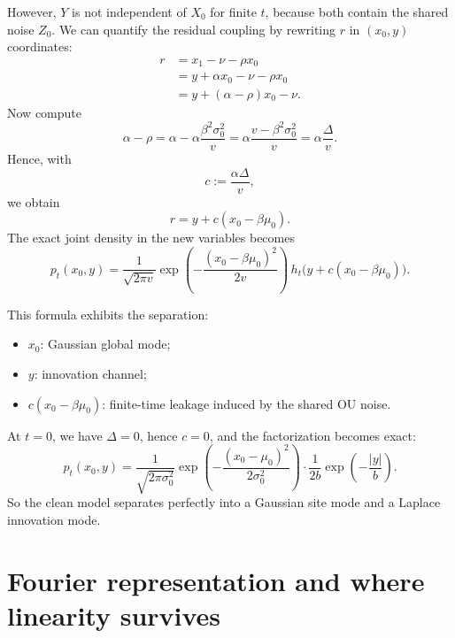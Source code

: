 \documentclass[11pt]{article}
\newcommand{\1}{\mathbf{1}}
\newcommand{\pt}{p_t}
\theoremstyle{definition}
\begin{document}
However, \(Y\) is not independent of \(X_0\) for finite \(t\), because both contain the shared noise \(Z_0\). We can quantify the residual coupling by rewriting \(r\) in \((x_0,y)\) coordinates:
\begin{align}
r
&= x_1 - \nu - \rho x_0 \\
&= y + \alpha x_0 - \nu - \rho x_0 \\
&= y + (\alpha-\rho)x_0 - \nu.
\end{align}
Now compute
\begin{equation}
\alpha-\rho = \alpha - \alpha\frac{\beta^2\sigma_0^2}{v}
= \alpha\frac{v-\beta^2\sigma_0^2}{v}
= \alpha\frac{\Delta}{v}.
\end{equation}
Hence, with
\begin{equation}
\label{eq:c-definition}
c:=\frac{\alpha\Delta}{v},
\end{equation}
we obtain
\begin{equation}
\label{eq:r-in-x0-y}
r = y + c(x_0-\beta\mu_0).
\end{equation}
The exact joint density in the new variables becomes
\begin{equation}
\label{eq:pt-x0-y}
\boxed{
\pt(x_0,y)=\frac{1}{\sqrt{2\pi v}}\exp\!\left(-\frac{(x_0-\beta\mu_0)^2}{2v}\right)
\, h_t\big(y+c(x_0-\beta\mu_0)\big).
}
\end{equation}

This formula exhibits the separation:
\begin{itemize}[leftmargin=2em]
    \item \(x_0\): Gaussian global mode;
    \item \(y\): innovation channel;
    \item \(c(x_0-\beta\mu_0)\): finite-time leakage induced by the shared OU noise.
\end{itemize}

At \(t=0\), we have \(\Delta=0\), hence \(c=0\), and the factorization becomes exact:
\begin{equation}
\pt(x_0,y) = \frac{1}{\sqrt{2\pi\sigma_0^2}}\exp\!\left(-\frac{(x_0-\mu_0)^2}{2\sigma_0^2}\right)
\cdot
\frac{1}{2b}\exp\!\left(-\frac{|y|}{b}\right).
\end{equation}
So the clean model separates perfectly into a Gaussian site mode and a Laplace innovation mode.

\section{Fourier representation and where linearity survives}
\end{document}
